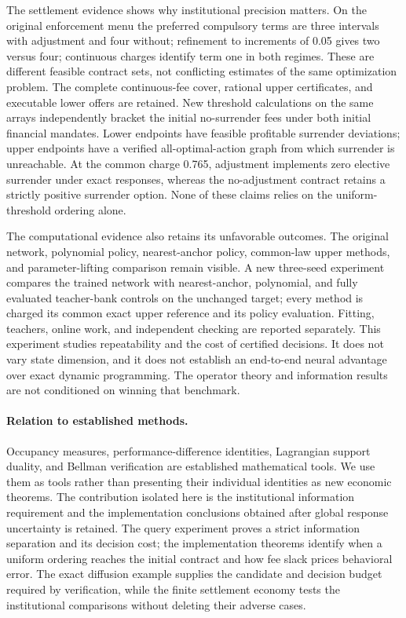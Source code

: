 The settlement evidence shows why institutional precision matters. On the original enforcement menu the preferred compulsory terms are three intervals with adjustment and four without; refinement to increments of 0.05 gives two versus four; continuous charges identify term one in both regimes. These are different feasible contract sets, not conflicting estimates of the same optimization problem. The complete continuous-fee cover, rational upper certificates, and executable lower offers are retained. New threshold calculations on the same arrays independently bracket the initial no-surrender fees under both initial financial mandates. Lower endpoints have feasible profitable surrender deviations; upper endpoints have a verified all-optimal-action graph from which surrender is unreachable. At the common charge 0.765, adjustment implements zero elective surrender under exact responses, whereas the no-adjustment contract retains a strictly positive surrender option. None of these claims relies on the uniform-threshold ordering alone.

The computational evidence also retains its unfavorable outcomes. The original network, polynomial policy, nearest-anchor policy, common-law upper methods, and parameter-lifting comparison remain visible. A new three-seed experiment compares the trained network with nearest-anchor, polynomial, and fully evaluated teacher-bank controls on the unchanged target; every method is charged its common exact upper reference and its policy evaluation. Fitting, teachers, online work, and independent checking are reported separately. This experiment studies repeatability and the cost of certified decisions. It does not vary state dimension, and it does not establish an end-to-end neural advantage over exact dynamic programming. The operator theory and information results are not conditioned on winning that benchmark.

\paragraph*{Relation to established methods.}
Occupancy measures, performance-difference identities, Lagrangian support duality, and Bellman verification are established mathematical tools. We use them as tools rather than presenting their individual identities as new economic theorems. The contribution isolated here is the institutional information requirement and the implementation conclusions obtained after global response uncertainty is retained. The query experiment proves a strict information separation and its decision cost; the implementation theorems identify when a uniform ordering reaches the initial contract and how fee slack prices behavioral error. The exact diffusion example supplies the candidate and decision budget required by verification, while the finite settlement economy tests the institutional comparisons without deleting their adverse cases.

